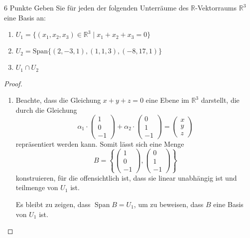 \documentclass{problemset}
\begin{document}
\begin{problem}{6 Punkte}
Geben Sie für jeden der folgenden Unterräume des $\mathbb{R}$-Vektorraums $\mathbb{R}^3$ eine Basis an:
\begin{enumerate}
	\item $U_1 = \{(x_1, x_2, x_3) \in \mathbb{R}^3 \mid x_1 + x_2 + x_3 = 0\}$
	\item $U_2 = \text{Span}\{(2, -3, 1), (1, 1, 3), (-8, 17, 1)\}$
	\item $U_1 \cap U_2$
\end{enumerate}
\begin{proof}
	$ $

	\begin{enumerate}
		\item Beachte, dass die Gleichung $x + y + z = 0$ eine Ebene im $\mathbb{R}^3$ darstellt, die durch die Gleichung
		      \[
			      \alpha_1 \cdot \begin{pmatrix}
				      1 \\
				      0 \\
				      -1
			      \end{pmatrix} + \alpha_2 \cdot \begin{pmatrix}
				      0 \\
				      1 \\
				      -1
			      \end{pmatrix} = \begin{pmatrix}
				      x \\
				      y \\
				      z
			      \end{pmatrix}
		      \]
		      repräsentiert werden kann. Somit lässt sich eine Menge
		      \[
			      B = \left\{\begin{pmatrix}
				      1 \\
				      0 \\
				      -1
			      \end{pmatrix}, \begin{pmatrix}
				      0 \\
				      1 \\
				      -1
			      \end{pmatrix}\right\}
		      \]
		      konstruieren, für die offensichtlich ist, dass sie linear unabhängig ist und teilmenge von $U_1$ ist.

		      Es bleibt zu zeigen, dass $\operatorname{Span} B = U_1$, um zu beweisen, dass $B$ eine Basis von $U_1$ ist.


\end{enumerate}
\end{proof}
\end{problem}
\end{document}
